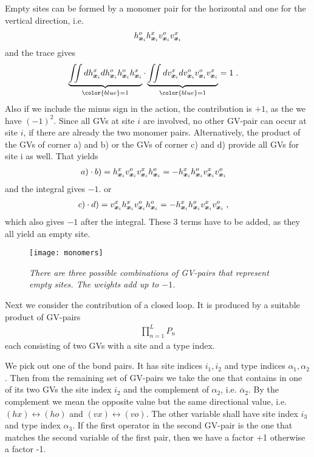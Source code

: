 Empty sites can be formed by a monomer pair for the horizontal and one for the vertical
direction, i.e.
%
\begin{align*}
h^{o}_{\boldsymbol x_{i}} h^{x}_{\boldsymbol x_{i}}v^{o}_{\boldsymbol x_{i}}v^{x}_{\boldsymbol x_{i}}
\end{align*}
%
and the trace gives 
%
\begin{align*}
\underbrace{
\iint d \hdag{\xx{i}} d \hnag{\xx{i}}\hnag{\xx{i}} \hdag{\xx{i}}
}_{\color{blue} = 1}
\cdot\underbrace{
\iint d \vdag{\xx{i}} d \vnag{\xx{i}} \vnag{\xx{i}}\vdag{\xx{i}} 
}_{\color{blue} = 1}&= 1\;.
\end{align*}
%
Also if we include the minus sign in the action, the contribution is $+1$, as the we have $(-1)^{2}$.
Since all GVs at site $i$ are involved, no other GV-pair can occur at site $i$, if there are already the two monomer pairs. 
Alternatively, the product of the GVs of corner a) and b) or  the GVs of corner c) and d)   provide all GVs for site i as well. That yields
%
\begin{align*}
a) \cdot   b) &= h^{x}_{\boldsymbol x_{i}}v^{o}_{\boldsymbol x_{i}} v^{x}_{\boldsymbol x_{i}} h^{o}_{\boldsymbol x_{i}} =- h^{x}_{\boldsymbol x_{i}} h^{o}_{\boldsymbol x_{i}}  v^{x}_{\boldsymbol x_{i}}v^{o}_{\boldsymbol x_{i}} 
\end{align*}
%
and the integral gives $-1$. or
\begin{align*}
c) \cdot  d) &=v^{x}_{\boldsymbol x_{i}}  h^{x}_{\boldsymbol x_{i}}v^{o}_{\boldsymbol x_{i}}  h^{o}_{\boldsymbol x_{i}} =- h^{x}_{\boldsymbol x_{i}} h^{o}_{\boldsymbol x_{i}}  v^{x}_{\boldsymbol x_{i}}v^{o}_{\boldsymbol x_{i}} \;,
\end{align*}
which also gives $-1$ after the integral.
These 3 terms have to be added, as they all yield an empty site. 


\begin{figure}[h]
\begin{center}
\texttt{[image: monomers]}
\caption{\it There are three possible combinations of GV-pairs that represent empty sites.
The weights add up to $-1$.\label{fig:empty_sites}}
\end{center}
\end{figure}
%


Next we consider the contribution of a closed loop. It is produced by a suitable product
of GV-pairs 
%
\begin{align*}
\prod_{n=1}^{L}  P_{n}
\end{align*}
%
each consisting of two GVs with a site and a type index.

We pick out one  of the bond pairs. It has site indices 
$i_{1}, i_{2}$ and type indices $\alpha_{1},\alpha_{2}$. Then from the remaining set of 
GV-pairs we take the one that contains  in one of its two GVs the site index $i_{2}$ and 
the complement of $\alpha_{2}$, i.e. $\overline \alpha_{2}$. By the complement we mean the opposite \mode value but the same directional value, i.e.
$(h x)\leftrightarrow (h o)$ and $(v x)\leftrightarrow (v o)$. The other variable shall have
site index $i_{3}$ and type index $\alpha_{3}$. 
If the first operator in the second GV-pair is the one that matches the second variable of the first pair, then we have a factor +1 otherwise a factor -1. 

